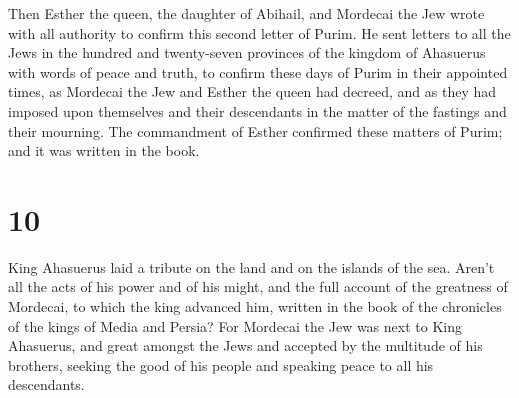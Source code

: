  Then Esther the queen, the daughter of Abihail, and
Mordecai the Jew wrote with all authority to confirm this second letter
of Purim.  He sent letters to all the Jews in the hundred
and twenty-seven provinces of the kingdom of Ahasuerus with words of
peace and truth,  to confirm these days of Purim in their
appointed times, as Mordecai the Jew and Esther the queen had decreed,
and as they had imposed upon themselves and their descendants in the
matter of the fastings and their mourning.  The
commandment of Esther confirmed these matters of Purim; and it was
written in the book.

\hypertarget{section-9}{%
\section{10}\label{section-9}}

 King Ahasuerus laid a tribute on the land and on the
islands of the sea.  Aren't all the acts of his power and
of his might, and the full account of the greatness of Mordecai, to
which the king advanced him, written in the book of the chronicles of
the kings of Media and Persia?  For Mordecai the Jew was
next to King Ahasuerus, and great amongst the Jews and accepted by the
multitude of his brothers, seeking the good of his people and speaking
peace to all his descendants.
